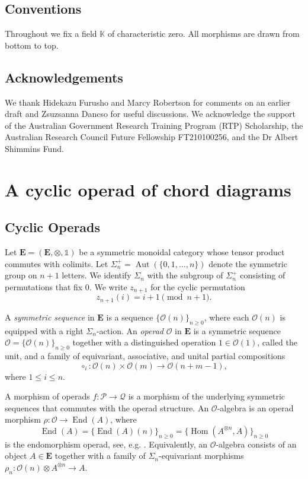 \documentclass{amsart}
\newcommand{\bE}{\mathbf{E}}
\newcommand{\calO}{\mathcal{O}}
\newcommand{\calQ}{\mathcal{Q}}
\newcommand{\kk}{\mathbb{K}}    %
\newcommand{\calP}{\mathcal{P}}
\newcommand{\End}{\operatorname{End}}
\newcommand{\Hom}{\operatorname{Hom}}
\newcommand{\Aut}{\operatorname{Aut}}
\newcommand{\lrar}{\ensuremath{\longrightarrow}}
\theoremstyle{definition}
\numberwithin{equation}{section}
\begin{document}
\subsection*{Conventions} Throughout we fix a field $\kk$ of characteristic zero. All morphisms are drawn from bottom to top.

\subsection*{Acknowledgements} 
We thank Hidekazu Furusho and Marcy Robertson for comments on an earlier draft and Zsuzsanna Dancso for useful discussions. We acknowledge the support of the Australian Government Research Training Program (RTP) Scholarship, the Australian Research Council Future Fellowship FT210100256, and the Dr Albert Shimmins Fund.


\section{A cyclic operad of chord diagrams }\label{sec: cyclic chord diagrams}

\subsection{Cyclic Operads} 

Let $\bE=(\bE,\otimes,\mathbb{1})$ be a symmetric monoidal category whose tensor product commutes with colimits. Let $\Sigma_n^+ = \Aut(\{0,1,\ldots,n\})$ denote the symmetric group on $n+1$ letters. We identify $\Sigma_n$ with the subgroup of $\Sigma_n^+$ consisting of permutations that fix $0$. We write $z_{n+1}$ for the cyclic permutation
\[
z_{n+1}(i) = i+1 \pmod{n+1}.
\]

A \emph{symmetric sequence} in $\bE$ is a sequence $\{\calO(n)\}_{n\geq 0}$, where each $\calO(n)$ is equipped with a right $\Sigma_n$-action. An \emph{operad} $\calO$ in $\bE$ is a symmetric sequence $\calO=\{\calO(n)\}_{n\geq 0}$ together with a distinguished operation $1\in \calO(1)$, called the unit, and a family of equivariant, associative, and unital partial compositions
\[
\circ_i : \calO(n)\times \calO(m)\to \calO(n+m-1),
\]
where $1\leq i\leq n$.

A morphism of operads $f:\calP\lrar\calQ$ is a morphism of the underlying symmetric sequences that commutes with the operad structure. An $\calO$-algebra is an operad morphism $\rho:\calO\to \End(A)$, where
\[
\End(A)=\{\End(A)(n)\}_{n\geq 0}=\{\Hom(A^{\otimes n},A)\}_{n\geq 0}
\]
is the endomorphism operad, see, e.g. \cite{gk_cyc}. Equivalently, an $\calO$-algebra consists of an object $A\in\bE$ together with a family of $\Sigma_n$-equivariant morphisms $\rho_n:\calO(n)\otimes A^{\otimes n}\rightarrow A$. 
\end{document}
